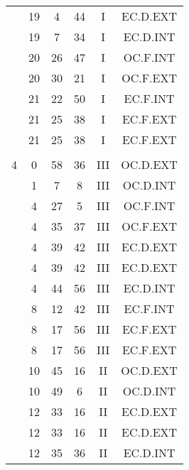 \documentclass[12pt, a4paper]{article}
\begin{document}
\begin{multicols}{3}
{\begin{tabular}{c c c c c c}
	 	 	 	 & 19 & 4 & 44 & I & EC.D.EXT\\%
	 	 	 	 & 19 & 7 & 34 & I & EC.D.INT\\%
	 	 	 	 & 20 & 26 & 47 & I & OC.F.INT\\%
	 	 	 	 & 20 & 30 & 21 & I & OC.F.EXT\\%
	 	 	 	 & 21 & 22 & 50 & I & EC.F.INT\\%
	 	 	 	 & 21 & 25 & 38 & I & EC.F.EXT\\%
	 	 	 	 & 21 & 25 & 38 & I & EC.F.EXT\\%
	 	 	 	 & & & & & \\%
	 	 	 	4 & 0 & 58 & 36 & III & OC.D.EXT\\%
	 	 	 	 & 1 & 7 & 8 & III & OC.D.INT\\%
	 	 	 	 & 4 & 27 & 5 & III & OC.F.INT\\%
	 	 	 	 & 4 & 35 & 37 & III & OC.F.EXT\\%
	 	 	 	 & 4 & 39 & 42 & III & EC.D.EXT\\%
	 	 	 	 & 4 & 39 & 42 & III & EC.D.EXT\\%
	 	 	 	 & 4 & 44 & 56 & III & EC.D.INT\\%
	 	 	 	 & 8 & 12 & 42 & III & EC.F.INT\\%
	 	 	 	 & 8 & 17 & 56 & III & EC.F.EXT\\%
	 	 	 	 & 8 & 17 & 56 & III & EC.F.EXT\\%
	 	 	 	 & 10 & 45 & 16 & II & OC.D.EXT\\%
	 	 	 	 & 10 & 49 & 6 & II & OC.D.INT\\%
	 	 	 	 & 12 & 33 & 16 & II & EC.D.EXT\\%
	 	 	 	 & 12 & 33 & 16 & II & EC.D.EXT\\%
	 	 	 	 & 12 & 35 & 36 & II & EC.D.INT\\%

\end{tabular}}
\end{multicols}
\end{document}
